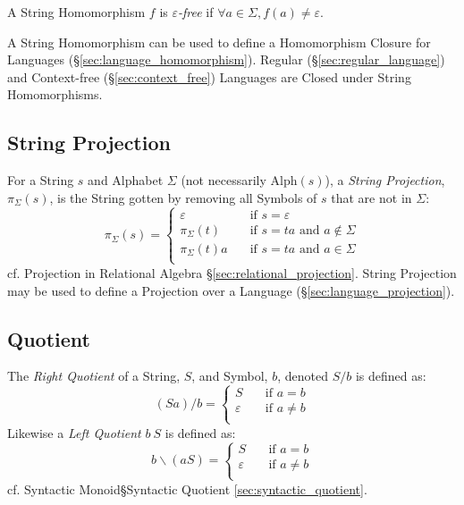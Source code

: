 A String Homomorphism $f$ is \emph{$\varepsilon$-free} if $\forall a
\in \Sigma, f(a) \neq \varepsilon$.

A String Homomorphism can
be used to define a Homomorphism Closure for Languages
(\S\ref{sec:language_homomorphism}). Regular
(\S\ref{sec:regular_language}) and Context-free
(\S\ref{sec:context_free}) Languages are Closed under String
Homomorphisms.



\subsection{String Projection}\label{sec:string_projection}

For a String $s$ and Alphabet $\Sigma$ (not necessarily
$\text{Alph}(s)$), a \emph{String Projection}, $\pi_{\Sigma}(s)$, is
the String gotten by removing all Symbols of $s$ that are not in
$\Sigma$:
\[
  \pi_{\Sigma}(s) =
  \begin{cases}
    \varepsilon       & \quad \text{if $s = \varepsilon$}\\
    \pi_{\Sigma}(t)   & \quad \text{if $s = ta$ and $a \notin \Sigma$}\\
    \pi_{\Sigma}(t)a  & \quad \text{if $s = ta$ and $a \in \Sigma$}\\
  \end{cases}
\]
cf. Projection in Relational Algebra
\S\ref{sec:relational_projection}. String Projection may be used to
define a Projection over a Language (\S\ref{sec:language_projection}).



\subsection{Quotient}\label{sec:string_quotient}

The \emph{Right Quotient} of a String, $S$, and Symbol, $b$, denoted
$S / b$ is defined as:
\[
  (Sa)/b =
  \begin{cases}
    S           & \quad \text{if $a = b$}\\
    \varepsilon & \quad \text{if $a \neq b$}\\
  \end{cases}
\]
Likewise a \emph{Left Quotient} $b \ S$ is defined as:
\[
  b\backslash(aS) =
  \begin{cases}
    S           & \quad \text{if $a = b$}\\
    \varepsilon & \quad \text{if $a \neq b$}\\
  \end{cases}
\]
cf. Syntactic Monoid\S Syntactic Quotient \ref{sec:syntactic_quotient}.



